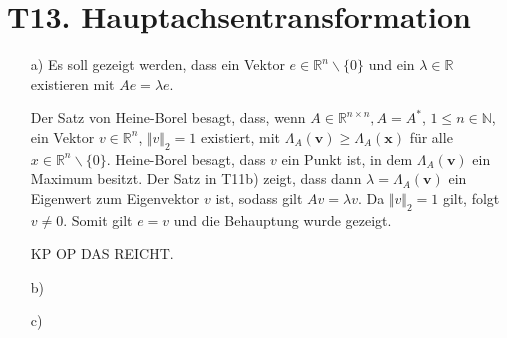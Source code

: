 \documentclass[11pt]{article}
\theoremstyle{plain}
\theoremstyle{definition}
\let\mbb\boldsymbol
\renewcommand\boldsymbol{\mbb}
\renewcommand{\u}{\"{u}}
\newcommand{\rayx}{\Lambda_A(\mbb{x})}
\newcommand{\rayv}{\Lambda_A(\mbb{v})}
\begin{document}
\section*{T13. Hauptachsentransformation}
\begin{itemize}
\item[a)]
Es soll gezeigt werden, dass ein Vektor $e\in \mathbb{R}^n \backslash \{0\}$ und ein $\lambda\in \mathbb{R}$ existieren mit $Ae=\lambda e$.

Der Satz von Heine-Borel besagt, dass, wenn  $A \in \mathbb{R}^{n \times n}, A=A^*$, $1 \leq n \in \mathbb{N}$, ein Vektor $v\in  \mathbb{R}^n$, $\Vert v\Vert_2 = 1$ existiert, mit $\rayv \geq \rayx$ f\u r alle $x\in \mathbb{R}^n \backslash \{0\}$. Heine-Borel besagt, dass $v$ ein Punkt ist, in dem $\rayv$ ein Maximum besitzt. Der Satz in T11b) zeigt, dass dann $\lambda = \rayv$ ein Eigenwert zum Eigenvektor $v$ ist, sodass gilt $Av=\lambda v$. Da $\Vert v\Vert_2 = 1$ gilt, folgt $v \neq 0$. Somit gilt $e=v$ und die Behauptung wurde gezeigt. 

KP OP DAS REICHT.
\item[b)]

\item[c)]

\end{itemize}
\end{document}
